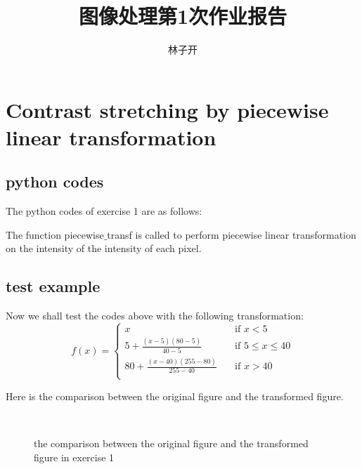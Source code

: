 \documentclass{article}
\title{图像处理第1次作业报告}
\author{林子开}
\begin{document}
	\maketitle
	\tableofcontents

\section{Contrast stretching by piecewise linear transformation}
\subsection{python codes}
The python codes of exercise 1 are as follows:

\par The function piecewise$\_$transf is called to perform piecewise linear transformation on the intensity of the intensity of each pixel.

\subsection{test example}
Now we shall test the codes above with the following transformation:
\[
f(x) =
\begin{cases}
x &\quad\text{if } x<5\\
5 + \frac{(x-5)(80-5)}{40-5} &\quad\text{if } 5\le x \le 40 \\
80 + \frac{(x-40)(255-80)}{255-40} &\quad\text{if } x > 40\\
\end{cases}
\]

\par Here is the comparison between the original figure and the transformed figure.


\begin{figure}[H]
	\centering
	\label{ob}
	\,    %
	\label{ob_trans}
	\caption{the comparison between the original figure and the transformed figure in exercise 1}
\end{figure}
\end{document}
